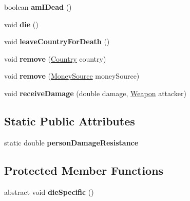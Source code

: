 \begin{DoxyCompactItemize}
\item 
boolean {\bfseries am\+I\+Dead} ()\hypertarget{classpeople_1_1_abstract_person_ab1126488078b78133d129797a66aafc7}{}\label{classpeople_1_1_abstract_person_ab1126488078b78133d129797a66aafc7}

\item 
void {\bfseries die} ()\hypertarget{classpeople_1_1_abstract_person_aac69d3802b8a3a8fea2c7b1319beaf7b}{}\label{classpeople_1_1_abstract_person_aac69d3802b8a3a8fea2c7b1319beaf7b}

\item 
void {\bfseries leave\+Country\+For\+Death} ()\hypertarget{classpeople_1_1_abstract_person_affd7adb735c4978611b3d1fa7c19c9af}{}\label{classpeople_1_1_abstract_person_affd7adb735c4978611b3d1fa7c19c9af}

\item 
void {\bfseries remove} (\hyperlink{classplanets_1_1_country}{Country} country)\hypertarget{classpeople_1_1_abstract_person_ae1355612622444158a65ec230cc14880}{}\label{classpeople_1_1_abstract_person_ae1355612622444158a65ec230cc14880}

\item 
void {\bfseries remove} (\hyperlink{classuniverse_1_1_money_source}{Money\+Source} money\+Source)\hypertarget{classpeople_1_1_abstract_person_aba12022a8397e76fe508ebe5b9b463cc}{}\label{classpeople_1_1_abstract_person_aba12022a8397e76fe508ebe5b9b463cc}

\item 
void {\bfseries receive\+Damage} (double damage, \hyperlink{classtools_1_1weapons_1_1_weapon}{Weapon} attacker)\hypertarget{classpeople_1_1_abstract_person_accc76d9f2eb65cea92656508cb578131}{}\label{classpeople_1_1_abstract_person_accc76d9f2eb65cea92656508cb578131}

\end{DoxyCompactItemize}
\subsection*{Static Public Attributes}
\begin{DoxyCompactItemize}
\item 
static double {\bfseries person\+Damage\+Resistance}\hypertarget{classpeople_1_1_abstract_person_a9ba6d8d5622fa5e1ca46a77e798ecfac}{}\label{classpeople_1_1_abstract_person_a9ba6d8d5622fa5e1ca46a77e798ecfac}

\end{DoxyCompactItemize}
\subsection*{Protected Member Functions}
\begin{DoxyCompactItemize}
\item 
abstract void {\bfseries die\+Specific} ()\hypertarget{classpeople_1_1_abstract_person_abcbb471ac3f254118fec8be489905b0e}{}\label{classpeople_1_1_abstract_person_abcbb471ac3f254118fec8be489905b0e}

\end{DoxyCompactItemize}
